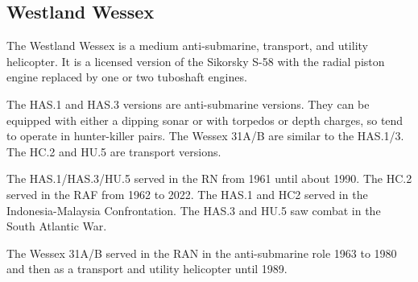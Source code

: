 \subsection{Westland Wessex}

The Westland Wessex is a medium anti-submarine, transport, and utility helicopter. It is a licensed version of the Sikorsky S-58 with the radial piston engine replaced by one or two tuboshaft engines.

The HAS.1 and HAS.3 versions are anti-submarine versions. They can be equipped with either a dipping sonar or with torpedos or depth charges, so tend to operate in hunter-killer pairs. The Wessex 31A/B are similar to the HAS.1/3. The HC.2 and HU.5 are transport versions. 

The HAS.1/HAS.3/HU.5 served in the RN from 1961 until about 1990. The HC.2 served in the RAF from 1962 to 2022. The HAS.1 and HC2 served in the Indonesia-Malaysia Confrontation. The HAS.3 and HU.5 saw combat in the South Atlantic War.

The Wessex 31A/B served in the RAN in the anti-submarine role 1963 to 1980 and then as a transport and utility helicopter until 1989.
